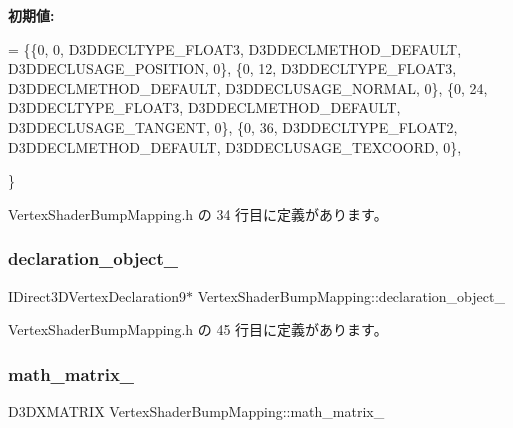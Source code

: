 {\bfseries 初期値\+:}
\begin{DoxyCode}
= \{\{0,  0, D3DDECLTYPE\_FLOAT3, D3DDECLMETHOD\_DEFAULT, D3DDECLUSAGE\_POSITION, 0\},
   \{0, 12, D3DDECLTYPE\_FLOAT3, D3DDECLMETHOD\_DEFAULT, D3DDECLUSAGE\_NORMAL,   0\},
   \{0, 24, D3DDECLTYPE\_FLOAT3, D3DDECLMETHOD\_DEFAULT, D3DDECLUSAGE\_TANGENT,  0\},
   \{0, 36, D3DDECLTYPE\_FLOAT2, D3DDECLMETHOD\_DEFAULT, D3DDECLUSAGE\_TEXCOORD, 0\},

\}
\end{DoxyCode}


 Vertex\+Shader\+Bump\+Mapping.\+h の 34 行目に定義があります。

\mbox{\label{class_vertex_shader_bump_mapping_a6e45d81a2a9c8ba7071b7f2686264a49}} 
\subsubsection{\texorpdfstring{declaration\+\_\+object\+\_\+}{declaration\_object\_}}
{\footnotesize\ttfamily I\+Direct3\+D\+Vertex\+Declaration9$\ast$ Vertex\+Shader\+Bump\+Mapping\+::declaration\+\_\+object\+\_\+\hspace{0.3cm}{\ttfamily [private]}}



 Vertex\+Shader\+Bump\+Mapping.\+h の 45 行目に定義があります。

\mbox{\label{class_vertex_shader_bump_mapping_add6402e968835f3fe5e9c7681c33daef}} 
\subsubsection{\texorpdfstring{math\+\_\+matrix\+\_\+}{math\_matrix\_}}
{\footnotesize\ttfamily D3\+D\+X\+M\+A\+T\+R\+IX Vertex\+Shader\+Bump\+Mapping\+::math\+\_\+matrix\+\_\+\hspace{0.3cm}{\ttfamily [private]}}



